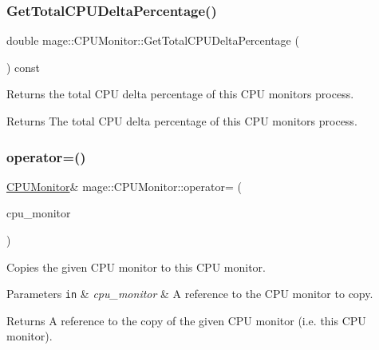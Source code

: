 \subsubsection{\texorpdfstring{Get\+Total\+C\+P\+U\+Delta\+Percentage()}{GetTotalCPUDeltaPercentage()}}
{\footnotesize\ttfamily double mage\+::\+C\+P\+U\+Monitor\+::\+Get\+Total\+C\+P\+U\+Delta\+Percentage (\begin{DoxyParamCaption}{ }\end{DoxyParamCaption}) const\hspace{0.3cm}{\ttfamily [noexcept]}}

Returns the total C\+PU delta percentage of this C\+PU monitor\textquotesingle{}s process.

\begin{DoxyReturn}{Returns}
The total C\+PU delta percentage of this C\+PU monitor\textquotesingle{}s process. 
\end{DoxyReturn}
\hypertarget{classmage_1_1_c_p_u_monitor_a6009df0994652d011a78d1f12013e599}{}\label{classmage_1_1_c_p_u_monitor_a6009df0994652d011a78d1f12013e599} 
\subsubsection{\texorpdfstring{operator=()}{operator=()}\hspace{0.1cm}{\footnotesize\ttfamily [1/2]}}
{\footnotesize\ttfamily \hyperlink{classmage_1_1_c_p_u_monitor}{C\+P\+U\+Monitor}\& mage\+::\+C\+P\+U\+Monitor\+::operator= (\begin{DoxyParamCaption}\item[{const \hyperlink{classmage_1_1_c_p_u_monitor}{C\+P\+U\+Monitor} \&}]{cpu\+\_\+monitor }\end{DoxyParamCaption})}

Copies the given C\+PU monitor to this C\+PU monitor.


\begin{DoxyParams}[1]{Parameters}
\mbox{\tt in}  & {\em cpu\+\_\+monitor} & A reference to the C\+PU monitor to copy. \\
\hline
\end{DoxyParams}
\begin{DoxyReturn}{Returns}
A reference to the copy of the given C\+PU monitor (i.\+e. this C\+PU monitor). 
\end{DoxyReturn}
\hypertarget{classmage_1_1_c_p_u_monitor_ad931f354e4191429937cb2c3e44290f1}{}\label{classmage_1_1_c_p_u_monitor_ad931f354e4191429937cb2c3e44290f1} 
